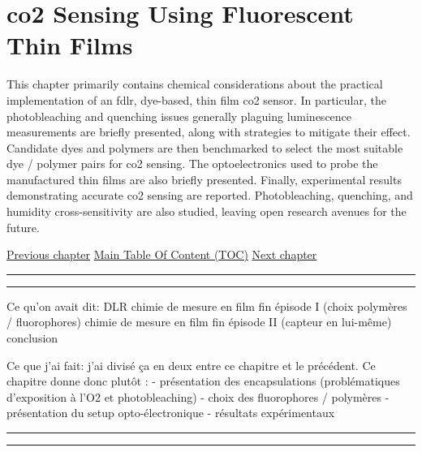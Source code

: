 \chapter{\texorpdfstring{\gls{co2}}{CO2} Sensing Using Fluorescent Thin Films}\label{chap:thin_film}

\setcounter{secnumdepth}{4}

\begin{tldrbox}
	
	This chapter primarily contains chemical considerations about the practical implementation of an \gls{fdlr}, dye-based, thin film \gls{co2} sensor. In particular, the photobleaching and quenching issues generally plaguing luminescence measurements are briefly presented, along with strategies to mitigate their effect. Candidate dyes and polymers are then benchmarked to select the most suitable dye / polymer pairs for \gls{co2} sensing. The optoelectronics used to probe the manufactured thin films are also briefly presented. Finally, experimental results demonstrating accurate \invitro{} \gls{co2} sensing are reported. Photobleaching, quenching, and humidity cross-sensitivity are also studied, leaving open research avenues for the future.
	
	\tcblower
	
	\hyperref[chap:choosing_techno]{Previous chapter} \hfill \hyperref[chapter:toc]{Main Table Of Content (TOC)} \hfill \hyperref[chap:conclusion]{Next chapter}
	
\end{tldrbox}

\vspace{.3cm}\hrule\vspace{.1cm}\hrule\vspace{.3cm}

Ce qu'on avait dit: DLR 
chimie de mesure en film fin épisode I (choix polymères / fluorophores)
chimie de mesure en film fin épisode II (capteur en lui-même)
conclusion

Ce que j'ai fait: j'ai divisé ça en deux entre ce chapitre et le précédent. Ce chapitre donne donc plutôt :
- présentation des encapsulations (problématiques d'exposition à l'O2 et photobleaching)
- choix des fluorophores / polymères
- présentation du setup opto-électronique
- résultats expérimentaux

\vspace{.3cm}\hrule\vspace{.1cm}\hrule\vspace{.3cm}


